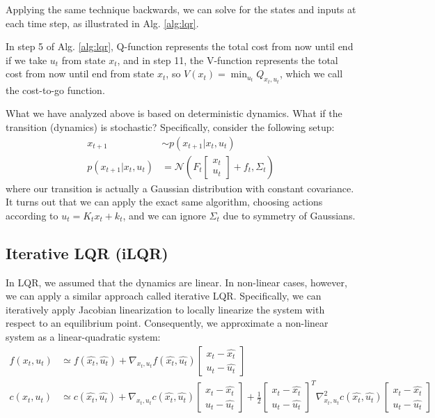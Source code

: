 Applying the same technique backwards, we can solve for the states and inputs at each time step, as illustrated in Alg. \ref{alg:lqr}.

In step 5 of Alg. \ref{alg:lqr}, Q-function represents the total cost from now until end if we take $u_t$ from state $x_t$, and in step 11, the V-function represents the total cost from now until end from state $x_t$, so $V(x_t) = \min_{u_t}Q_{x_t,u_t}$, which we call the cost-to-go function. 

What we have analyzed above is based on deterministic dynamics. What if the transition (dynamics) is stochastic? Specifically, consider the following setup:
\begin{align*}
    x_{t+1} &\sim p(x_{t+1}|x_t,u_t)\\
    p(x_{t+1}|x_t,u_t) &= \mathcal{N}\left(F_t\begin{bmatrix}x_t\\u_t\end{bmatrix} + f_t, \Sigma_t\right)
\end{align*}
where our transition is actually a Gaussian distribution with constant covariance. It turns out that we can apply the exact same algorithm, choosing actions according to $u_t = K_tx_t + k_t$, and we can ignore $\Sigma_t$ due to symmetry of Gaussians.

\subsection{Iterative LQR (iLQR)}
In LQR, we assumed that the dynamics are linear. In non-linear cases, however, we can apply a similar approach called iterative LQR. Specifically, we can iteratively apply Jacobian linearization to locally linearize the system with respect to an equilibrium point. Consequently, we approximate a non-linear system as a linear-quadratic system:
\begin{align*}
    f(x_t,u_t) &\simeq f(\hat{x_t}, \hat{u_t}) + \nabla_{x_t,u_t}f(\hat{x_t}, \hat{u_t})\begin{bmatrix}x_t-\hat{x_t}\\u_t-\hat{u_t}\end{bmatrix}\\
    c(x_t,u_t) &\simeq c(\hat{x_t}, \hat{u_t}) + \nabla_{x_t,u_t}c(\hat{x_t}, \hat{u_t})\begin{bmatrix}x_t-\hat{x_t}\\u_t-\hat{u_t}\end{bmatrix} + \frac{1}{2}\begin{bmatrix}x_t-\hat{x_t}\\u_t-\hat{u_t}\end{bmatrix}^T\nabla^2_{x_t,u_t}c(\hat{x_t}, \hat{u_t})\begin{bmatrix}x_t-\hat{x_t}\\u_t-\hat{u_t}\end{bmatrix}
\end{align*}

